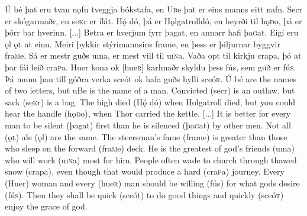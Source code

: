 \begin{paracol}{2}
  Ú bé þat eru tvau nǫfn tveggja bókstafa, en U\textsc{b}e þat er eins manns eitt nafn. Secr er skógarmaðr, en se\textsc{k}r er ílát. Hǫ́ dó, þá er Hǫlgatroll\footnotemark dó, en heyrði til hǫ\textsc{d}o, þá er þórr bar hverinn. [...] Betra er hverjum fyrr þagat, en annarr hafi þa\textsc{g}at. Eigi eru ǫl ǫ\textsc{l} at einu. Meiri þykkir stýrimannsins frame, en þess er þiljurnar byggvir fra\textsc{m}e. Sá er mestr guðs uına, er mest vill til uı\textsc{n}a. Vaða opt til kirkju crapa, þó at þar fái leið cra\textsc{p}a. Huer kona ok [hue\textsc{r}] karlmaðr skyldu þess fús, sem guð er fú\textsc{s}. Þá munu þau till góðra verka sceót ok hafa guðs hylli sceó\textsc{r}.
  \switchcolumn
  Ú bé are the names of two letters, but uBe is the name of a man. Convicted (secr) is an outlaw, but sack (se\textsc{k}r) is a bag. The high died (Hǫ́ dó) when Holgatroll died, but you could hear the handle (hǫ\textsc{d}o), when Thor carried the kettle. [...] It is better for every man to be silent (þagat) first than he is silenced (þa\textsc{g}at) by other men. Not all (ǫ\textsc{l}) ale (ǫl) are the same. The steersman's fame (frame) is greater than those who sleep on the forward (fra\textsc{m}e) deck. He is the greatest of god's friends (uına) who will work (uı\textsc{n}a) most for him. People often wade to church through thawed snow (crapa), even though that would produce a hard (cra\textsc{p}a) journey. Every (Huer) woman and every (hue\textsc{r}) man should be willing (fús) for what gods desire (fú\textsc{s}). Then they shall be quick (sceót) to do good things and quickly (sceó\textsc{t}) enjoy the grace of god.
\end{paracol}

